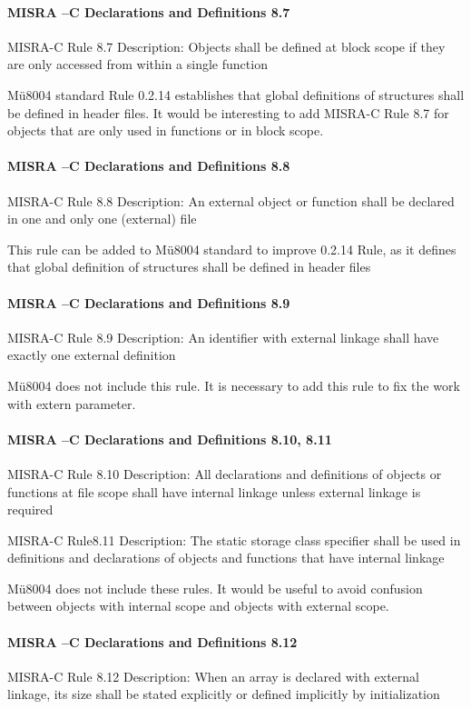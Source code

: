 \paragraph{MISRA –C Declarations and Definitions 8.7}
MISRA-C Rule 8.7 Description: Objects shall be defined at block scope if they are only accessed from within a single function

Mü8004 standard Rule 0.2.14 establishes that global definitions of structures shall be defined in header files. It would be interesting to add MISRA-C Rule 8.7 for objects that are only used in functions or in block scope.  

\paragraph{MISRA –C Declarations and Definitions 8.8}
MISRA-C Rule 8.8 Description: An external object or function shall be declared in one and only one (external) file

This rule can be added to Mü8004 standard to improve 0.2.14 Rule, as it defines that global definition of structures shall be defined in header files

\paragraph{MISRA –C Declarations and Definitions 8.9}
MISRA-C Rule 8.9 Description: An identifier with external linkage shall have exactly one external definition

Mü8004 does not include this rule. It is necessary to add this rule to fix the work with extern parameter.

\paragraph{MISRA –C Declarations and Definitions 8.10, 8.11}
MISRA-C Rule 8.10 Description: All declarations and definitions of objects or functions at file scope shall have internal linkage unless external linkage is required

MISRA-C Rule8.11 Description: The static storage class specifier shall be used in definitions and declarations of objects and functions that have internal linkage

Mü8004 does not include these rules. It would be useful to avoid confusion between objects with internal scope and objects with external scope.

\paragraph{MISRA –C Declarations and Definitions 8.12}
MISRA-C Rule 8.12 Description: When an array is declared with external linkage, its size shall be stated explicitly or defined implicitly by initialization 

